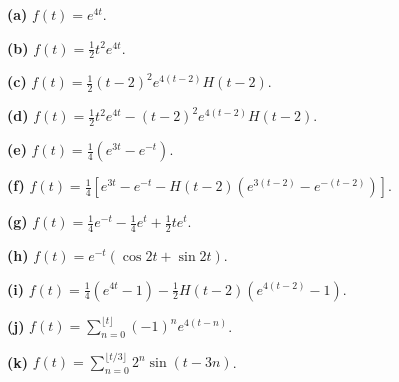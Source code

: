\noindent\textbf{(a)} \(f(t)=e^{4t}\).

\noindent\textbf{(b)} \(f(t)=\frac12t^2e^{4t}\).

\noindent\textbf{(c)} \(f(t)=\frac12(t-2)^2e^{4(t-2)}H(t-2)\).

\noindent\textbf{(d)} \(f(t)=\frac12t^2e^{4t}-(t-2)^2e^{4(t-2)}H(t-2)\).

\noindent\textbf{(e)} \(f(t)=\frac14(e^{3t}-e^{-t})\).

\noindent\textbf{(f)} \(f(t)=\frac14[e^{3t}-e^{-t}-H(t-2)(e^{3(t-2)}-e^{-(t-2)})]\).

\noindent\textbf{(g)} \(f(t)=\frac14e^{-t}-\frac14e^t+\frac12te^t\).

\noindent\textbf{(h)} \(f(t)=e^{-t}(\cos2t+\sin2t)\).

\noindent\textbf{(i)} \(f(t)=\frac14(e^{4t}-1)-\frac12H(t-2)(e^{4(t-2)}-1)\).

\noindent\textbf{(j)} \(f(t)=\sum_{n=0}^{\lfloor t\rfloor}(-1)^n e^{4(t-n)}\).

\noindent\textbf{(k)} \(f(t)=\sum_{n=0}^{\lfloor t/3\rfloor}2^n\sin(t-3n)\).
